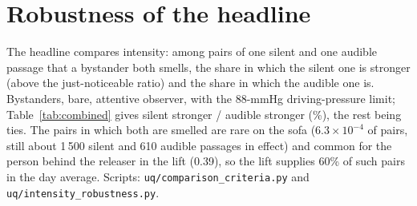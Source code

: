 \documentclass[11pt]{article}
\begin{document}
\section{Robustness of the headline}
\label{sec:si-robust}
The headline compares intensity: among pairs of one silent and one audible passage that a bystander both smells, the
share in which the silent one is stronger (above the just-noticeable ratio) and the share in which the audible one is.
Bystanders, bare, attentive observer, with the 88-mmHg driving-pressure limit; Table~\ref{tab:combined} gives silent
stronger / audible stronger (\%), the rest being ties. The pairs in which both are smelled are rare on the sofa
($6.3\times10^{-4}$ of pairs, still about 1\,500 silent and 610 audible passages in effect) and common for the person
behind the releaser in the lift (0.39), so the lift supplies 60\% of such pairs in the day average.
Scripts: \texttt{uq/comparison\_criteria.py} and \texttt{uq/intensity\_robustness.py}.
\end{document}
